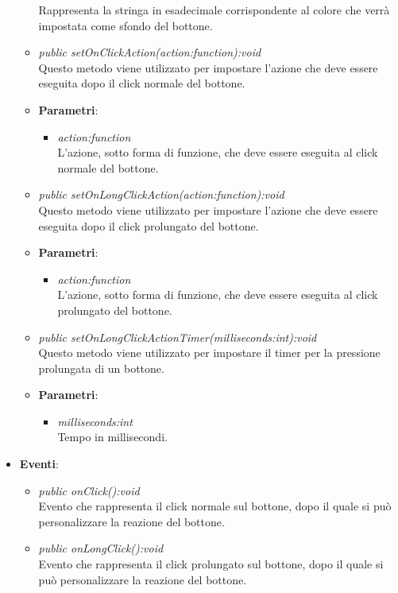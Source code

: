 \begin{itemize}
\begin{itemize}
{\begin{itemize}
		Rappresenta la stringa in esadecimale corrispondente al colore che verrà impostata come sfondo del bottone.
		\end{itemize}}
	\item \textit{public setOnClickAction(action:function):void}\\
	Questo metodo viene utilizzato per impostare l'azione che deve essere eseguita dopo il click normale del bottone.
		\item{\textbf{Parametri}: \begin{itemize}
		\item \textit{action:function}\\
		L'azione, sotto forma di funzione, che deve essere eseguita al click normale del bottone.
		\end{itemize}}
	\item \textit{public setOnLongClickAction(action:function):void}\\
		Questo metodo viene utilizzato per impostare l'azione che deve essere eseguita dopo il click prolungato del bottone.
		\item{\textbf{Parametri}: \begin{itemize}
		\item \textit{action:function}\\
		L'azione, sotto forma di funzione, che deve essere eseguita al click prolungato del bottone.
		\end{itemize}}
		\item \textit{public setOnLongClickActionTimer(milliseconds:int):void}\\
		Questo metodo viene utilizzato per impostare il timer per la pressione prolungata di un bottone.
				\item{\textbf{Parametri}: \begin{itemize}
				\item \textit{milliseconds:int}\\
				Tempo in millisecondi.
	\end{itemize}}
	\end{itemize}
\item \textbf{Eventi}:
	\begin{itemize}
	\item \textit{public onClick():void}\\
	Evento che rappresenta il click normale sul bottone, dopo il quale si può personalizzare la reazione del bottone.
	\item \textit{public onLongClick():void}\\
	Evento che rappresenta il click prolungato sul bottone, dopo il quale si può personalizzare la reazione del bottone.
	\end{itemize}
\end{itemize}

